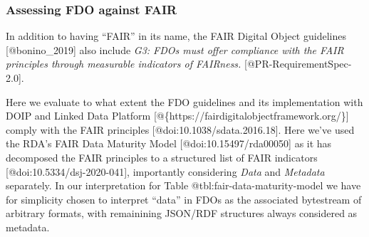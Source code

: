 \hypertarget{sec:fair-compare}{%
\subsubsection{Assessing FDO against FAIR}\label{sec:fair-compare}}

In addition to having ``FAIR'' in its name, the FAIR Digital Object
guidelines {[}@bonino\_2019{]} also include \emph{G3: FDOs must offer
compliance with the FAIR principles through measurable indicators of
FAIRness.} {[}@PR-RequirementSpec-2.0{]}.

Here we evaluate to what extent the FDO guidelines and its
implementation with DOIP and Linked Data Platform
{[}@\{https://fairdigitalobjectframework.org/\}{]} comply with the FAIR
principles {[}@doi:10.1038/sdata.2016.18{]}. Here we've used the RDA's
FAIR Data Maturity Model {[}@doi:10.15497/rda00050{]} as it has
decomposed the FAIR principles to a structured list of FAIR indicators
{[}@doi:10.5334/dsj-2020-041{]}, importantly considering \emph{Data} and
\emph{Metadata} separately. In our interpretation for Table
@tbl:fair-data-maturity-model we have for simplicity chosen to interpret
``data'' in FDOs as the associated bytestream of arbitrary formats, with
remainining JSON/RDF structures always considered as metadata.

